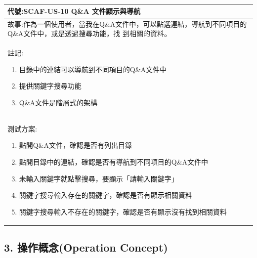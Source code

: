 \documentclass{report}
\begin{document}
\subsection*{}
\fontsize{12}{20}\selectfont
\begin{tabularx}{\textwidth}{|X|}
  \hline
  代號:SCAF-US-10 Q\&A 文件顯示與導航 \\
  \hline
  故事:作為一個使用者，當我在Q\&A文件中，可以點選連結，導航到不同項目的Q\&A文件中，或是透過搜尋功能，找
  到相關的資料。 \\
  \hline
  註記:
  \begin{enumerate}
    \item 目錄中的連結可以導航到不同項目的Q\&A文件中
    \item 提供關鍵字搜尋功能
    \item Q\&A文件是階層式的架構
  \end{enumerate} \\
  \hline
  測試方案:
  \begin{enumerate}
    \item 點開Q\&A文件，確認是否有列出目錄
    \item 點開目錄中的連結，確認是否有導航到不同項目的Q\&A文件中
    \item 未輸入關鍵字就點擊搜尋，要顯示「請輸入關鍵字」
    \item 關鍵字搜尋輸入存在的關鍵字，確認是否有顯示相關資料
    \item 關鍵字搜尋輸入不存在的關鍵字，確認是否有顯示沒有找到相關資料
  \end{enumerate} \\
  \hline
\end{tabularx}


\subsection*{3. 操作概念(Operation
 Concept)}
\end{document}
